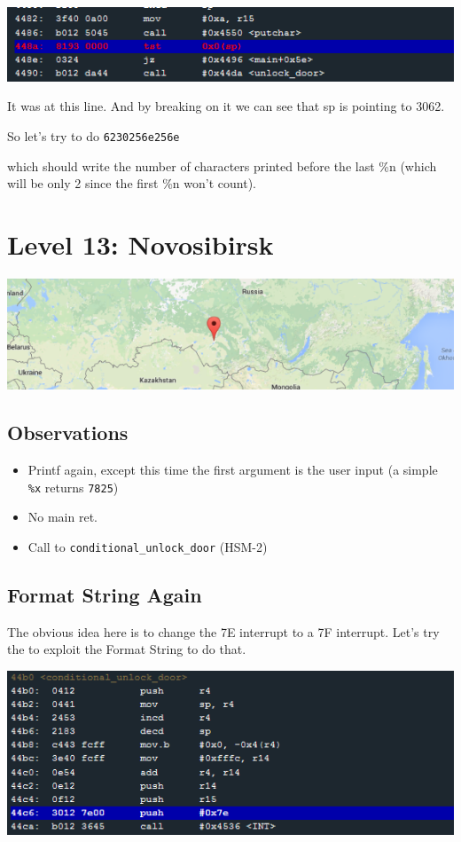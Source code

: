 \documentclass[a4paper,11pt]{article}
\begin{document}
\includegraphics{img/12_5.PNG}

It was at this line. And by breaking on it we can see that sp is
pointing to 3062.

So let's try to do \texttt{6230256e256e}

which should write the number of characters printed before the last \%n
(which will be only 2 since the first \%n won't count).

\section{Level 13: Novosibirsk}\label{level-13-novosibirsk}

\includegraphics{img/13_1.PNG}

\subsection{Observations}\label{observations-5}

\begin{itemize}
\itemsep1pt\parskip0pt
\item
  Printf again, except this time the first argument is the user input (a
  simple \texttt{\%x} returns \texttt{7825})
\item
  No main ret.
\item
  Call to \texttt{conditional\_unlock\_door} (HSM-2)
\end{itemize}

\subsection{Format String Again}\label{format-string-again}

The obvious idea here is to change the 7E interrupt to a 7F interrupt.
Let's try the to exploit the Format String to do that.

\includegraphics{img/13_2.PNG}
\end{document}
